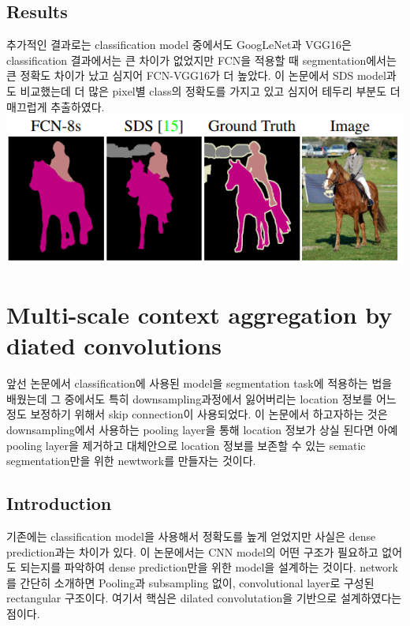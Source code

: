\documentclass[extendedabs]{bmvc2k}
\begin{document}
 \subsection{ Results }
 \quad 추가적인 결과로는 classification model 중에서도 GoogLeNet과 VGG16은 classification 결과에서는 
 큰 차이가 없었지만 FCN을 적용할 때 segmentation에서는 큰 정확도 차이가 났고 심지어 FCN-VGG16가 더 높았다. 이 논문에서  
 SDS model과도 비교했는데 더 많은 pixel별 class의 정확도를 가지고 있고 심지어 테두리 부분도 더 매끄럽게 추출하였다.
 \newline  \includegraphics[width=\linewidth]{images/09_D.PNG}  

 \section{Multi-scale context aggregation by diated convolutions}
 \quad 앞선 논문에서 classification에 사용된 model을 segmentation task에 적용하는 법을 배웠는데 그 중에서도 특히 downsampling과정에서 잃어버리는 
 location 정보를 어느정도 보정하기 위해서 skip connection이 사용되었다. 이 논문에서 하고자하는 것은 downsampling에서 사용하는 pooling layer을 통해
 location 정보가 상실 된다면 아예 pooling layer을 제거하고 대체안으로 location 정보를 보존할 수 있는 sematic segmentation만을 위한 newtwork를 만들자는 것이다.

 \subsection{Introduction}
 \quad 기존에는 classification model을 사용해서 정확도를 높게 얻었지만 사실은 dense prediction과는 차이가 있다. 이 논문에서는 
 CNN model의 어떤 구조가 필요하고 없어도 되는지를 파악하여 dense prediction만을 위한 model을 설계하는 것이다. network를 간단히
 소개하면 Pooling과 subsampling 없이, convolutional layer로 구성된 rectangular 구조이다. 여기서 핵심은 dilated convolutation을 기반으로 
 설계하였다는 점이다.
\end{document}
